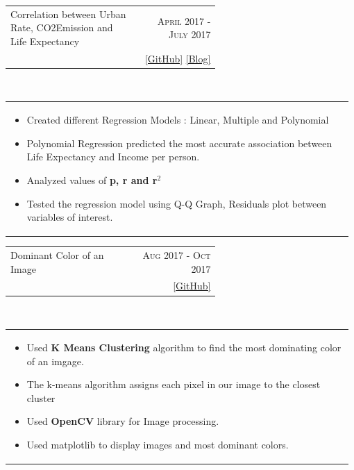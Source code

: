 \documentclass[a4paper]{article} %
\newcommand{\verticalspacing}{-0.25cm}
\newcommand{\bulletspace}{0.7cm}
\newcommand{\projectheadspacing}{6.9cm}
\newcommand{\cproject}[5]{%
    \begin{tabular}{p{0.60\linewidth}r}
        \textcolor{NavyBlue}{\small #2} & \multicolumn{1}{m{ \projectheadspacing{} }}{\raggedleft \small {\textsc{#1}}}\\
        \small {#3} & \small {#4}
    \end{tabular}\\
    \begin{tabular}{p{0.98\linewidth}}
    \vspace{-0.3cm}
        \small{#5}
    \end{tabular}
    \vspace{\verticalspacing{}}
}
\begin{document}
\cproject
    {April 2017 - July 2017}
    {Correlation between Urban Rate, CO2Emission and Life Expectancy}
    {\textsc{\raggedright Machine Learning, Coursera}}
    {\href{https://github.com/er-ashish01/Basics_of_Linear_Regression} {[GitHub]} \href{https://erashish01.tumblr.com/post/161823663110/basic-linear-regression-model-week-3} {[Blog]}}
    {%
        \begin{itemize}[leftmargin=\bulletspace{}]
            \item Created different Regression Models : Linear, Multiple and Polynomial
            \item Polynomial Regression predicted the most accurate association between Life Expectancy and Income per person.
            \item Analyzed values of \textbf{p, r and r$^{2}$}
            \item Tested the regression model using Q-Q Graph, Residuals plot between variables of interest.
        \end{itemize}
    }


\cproject
    {Aug 2017 - Oct 2017}
    {Dominant Color of an Image}
    {\textsc{\raggedright Image Processing, Coursera}}
    {\href{https://github.com/er-ashish01/Digit-Recognition} {[GitHub]}}
    {%
        \begin{itemize}[leftmargin=\bulletspace{}]
            \item Used \textbf{K Means Clustering} algorithm to find the most dominating color of an imgage.
            \item The k-means algorithm assigns each pixel in our image to the closest cluster
            \item Used \textbf{OpenCV} library for Image processing.
            \item Used matplotlib to display images and most dominant colors.
        \end{itemize}
    }


\end{document}
